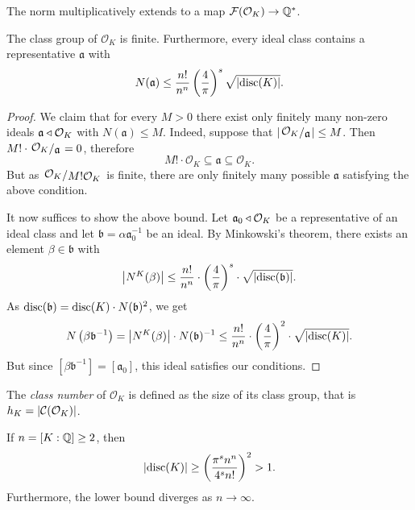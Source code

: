 \begin{opomba}
The norm multiplicatively extends to a map
$\mathcal{F}(\mathcal{O}_K) \to \mathbb{Q}^*$.
\end{opomba}

\begin{izrek}
The class group of $\mathcal{O}_K$ is finite. Furthermore, every
ideal class contains a representative $\mathfrak{a}$ with
\[
N(\mathfrak{a}) \leq
\frac{n!}{n^n} \left(\frac{4}{\pi}\right)^s \sqrt{\left\lvert \operatorname{disc}(K)\right\rvert}.
\]
\end{izrek}

\begin{proof}
We claim that for every $M > 0$ there exist only finitely many
non-zero ideals $\mathfrak{a} \triangleleft \mathcal{O}_K$ with
$N(\mathfrak{a}) \leq M$. Indeed, suppose that
$\abs{\kvoc{\mathcal{O}_K}{\mathfrak{a}}} \leq M$. Then
$M! \cdot \kvoc{\mathcal{O}_K}{\mathfrak{a}} = 0$, therefore
\[
M! \cdot \mathcal{O}_K \subseteq
\mathfrak{a} \subseteq
\mathcal{O}_K.
\]
But as $\kvoc{\mathcal{O}_K}{M! \mathcal{O}_K}$ is finite, there
are only finitely many possible $\mathfrak{a}$ satisfying the above
condition.

It now suffices to show the above bound. Let
$\mathfrak{a}_0 \triangleleft \mathcal{O}_K$ be a representative of an ideal
class and let $\mathfrak{b} = \alpha \mathfrak{a}_0^{-1}$ be an
ideal. By Minkowski's theorem, there exists an element
$\beta \in \mathfrak{b}$ with
\[
\left\lvert N^K(\beta)\right\rvert \leq
\frac{n!}{n^n} \cdot \left(\frac{4}{\pi}\right)^s \cdot
\sqrt{\left\lvert \operatorname{disc}(\mathfrak{b})\right\rvert}.
\]
As $\operatorname{disc}(\mathfrak{b}) = \operatorname{disc}(K) \cdot N(\mathfrak{b})^2$, we get
\[
N\left(\beta \mathfrak{b}^{-1}\right) =
\left\lvert N^K(\beta)\right\rvert \cdot N(\mathfrak{b})^{-1} \leq
\frac{n!}{n^n} \cdot \left(\frac{4}{\pi}\right)^2 \cdot
\sqrt{\left\lvert \operatorname{disc}(K)\right\rvert}.
\]
But since $[\beta \mathfrak{b}^{-1}] = [\mathfrak{a}_0]$, this
ideal satisfies our conditions.
\end{proof}

\begin{definicija}
The \emph{class number} of $\mathcal{O}_K$ is
defined as the size of its class group, that is
$h_K = \left\lvert \mathcal{C}(\mathcal{O}_K)\right\rvert$.
\end{definicija}

\begin{izrek}[Minkowski]
If $n = [K : \mathbb{Q}] \geq 2$, then
\[
\left\lvert \operatorname{disc}(K)\right\rvert \geq
\left(\frac{\pi^s n^n}{4^s n!}\right)^2 >
1.
\]
Furthermore, the lower bound diverges as $n \to \infty$.
\end{izrek}

